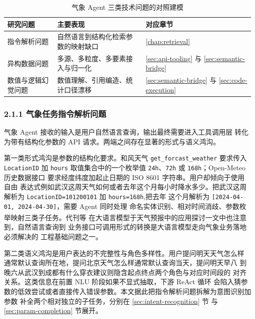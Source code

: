 \documentclass[a4paper]{article}
\newcommand{\song}{\CJKfamily{song}}
\theoremstyle{definition}
\theoremstyle{plain}
\theoremstyle{remark}
\let\oldcite\cite
\renewcommand{\cite}[1]{\textsuperscript{\oldcite{#1}}}
\newcommand{\bk}{\discretionary{}{}{}}
\begin{document}
\begin{table}[!ht]
    \centering
    \caption{气象 Agent 三类技术问题的对照建模}
    \label{tab:three-questions}
    \song\fontsize{9pt}{12pt}\selectfont
    \renewcommand{\arraystretch}{0.95}
    \begin{tabular}{lll}
        \toprule
        研究问题 & 主要表现 & 对应章节 \\
        \midrule
        指令解析问题 & 自然语言到结构化检索参数的映射缺口 & \ref{chap:retrieval} \\
        异构数据问题 & 多源、多粒度、多要素接入与归一化 & \ref{sec:api-tooling} 与 \ref{sec:semantic-bridge} \\
        数值与逻辑幻觉问题 & 数值理解、引用编造、统计口径漂移 & \ref{sec:semantic-bridge} 与 \ref{sec:code-execution} \\
        \bottomrule
    \end{tabular}
\end{table}

\subsubsection*{2.1.1 \quad 气象任务指令解析问题}

气象 Agent 接收的输入是用户自然语言查询，输出最终需要进入工具调用层
转化为带有结构化参数的 API 请求。两端之间存在显著的形式与语义鸿沟。

第一类形式鸿沟是参数的结构化要求。和风天气 \texttt{get\_\bk{}forcast\_\bk{}weather}
要求传入 \texttt{LocationID} 加 \texttt{hours} 取值集合中的一个枚举值
\texttt{24h}、\texttt{72h} 或 \texttt{168h}；Open-Meteo 历史数据接口
要求经度纬度加起止日期的 ISO 8601 字符串。用户却倾向于使用自由
表达式例如武汉这周天气如何或者去年这个月每小时降水多少。把武汉这周
解析为 \texttt{LocationID=\bk{}101200101} 加 \texttt{hours=\bk{}168h},把去年
这个月解析为 \texttt{[2024-04-01, 2024-04-30]}，需要 Agent 同时处理
命名实体识别、相对时间消歧、参数枚举映射三类子任务。代刊等 \cite{ref5}
在大语言模型于天气预报中的应用探讨一文中也注意到，自然语言查询到
业务接口可调用形式的转换是大语言模型走向气象业务落地必须解决的
工程基础问题之一。

第二类语义鸿沟是用户表达的不完整性与角色多样性。用户提问明天天气怎么样
通常默认查询所在地，提问北京天气怎么样通常默认查询当天，提问明天早八
到晚六从武汉到成都有什么穿衣建议则隐含起点终点两个角色与对应时间段的
对齐关系。这类信息在前置 NLU 阶段如果不显式抽取，下游 ReAct 循环
会陷入猜参数的低效尝试或者直接传入错误参数。本文据此把指令解析问题拆解为意图识别加参数
补全两个相对独立的子任务，分别在 \ref{sec:intent-recognition} 节
与 \ref{sec:param-completion} 节展开。
\end{document}
